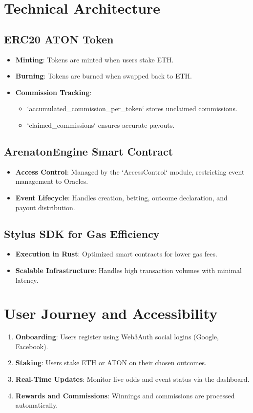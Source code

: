 \documentclass[9pt]{article}
\begin{document}
\begin{multicols}{2}
		\section{Technical Architecture}
		\subsection{ERC20 ATON Token}
		\begin{itemize}
			\item \textbf{Minting}: Tokens are minted when users stake ETH.
			\item \textbf{Burning}: Tokens are burned when swapped back to ETH.
			\item \textbf{Commission Tracking}:
			\begin{itemize}
				\item `accumulated\_commission\_per\_token` stores unclaimed commissions.
				\item `claimed\_commissions` ensures accurate payouts.
			\end{itemize}
		\end{itemize}
		
		\subsection{ArenatonEngine Smart Contract}
		\begin{itemize}
			\item \textbf{Access Control}: Managed by the `AccessControl` module, restricting event management to Oracles.
			\item \textbf{Event Lifecycle}: Handles creation, betting, outcome declaration, and payout distribution.
		\end{itemize}
		
		\subsection{Stylus SDK for Gas Efficiency}
		\begin{itemize}
			\item \textbf{Execution in Rust}: Optimized smart contracts for lower gas fees.
			\item \textbf{Scalable Infrastructure}: Handles high transaction volumes with minimal latency.
		\end{itemize}
		
		\section{User Journey and Accessibility}
		\begin{enumerate}
			\item \textbf{Onboarding}: Users register using Web3Auth social logins (Google, Facebook).
			\item \textbf{Staking}: Users stake ETH or ATON on their chosen outcomes.
			\item \textbf{Real-Time Updates}: Monitor live odds and event status via the dashboard.
			\item \textbf{Rewards and Commissions}: Winnings and commissions are processed automatically.
		\end{enumerate}
		

\end{multicols}
\end{document}
